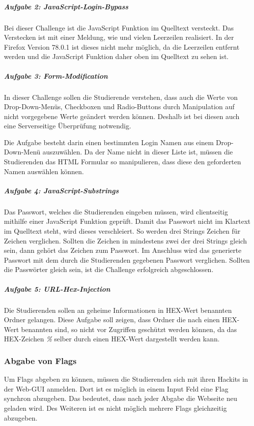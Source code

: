 \subparagraph{Aufgabe 2: JavaScript-Login-Bypass}\label{subpara:Aufgabe_2_JavaScript-Login-Bypass}
Bei dieser Challenge ist die JavaScript Funktion im Quelltext versteckt. Das Verstecken ist mit einer Meldung, wie  und vielen Leerzeilen realisiert. In der Firefox Version 78.0.1 ist dieses nicht mehr möglich, da die Leerzeilen entfernt werden und die JavaScript Funktion daher oben im Quelltext zu sehen ist.

\subparagraph{Aufgabe 3: Form-Modification}\label{subpara:Aufgabe_3_Form-Modification}
In dieser Challenge sollen die Studierende verstehen, dass auch die Werte von Drop-Down-Menüs, Checkboxen und Radio-Buttons durch Manipulation auf nicht vorgegebene Werte geändert werden können. Deshalb ist bei diesen auch eine Serverseitige Überprüfung notwendig.

Die Aufgabe besteht darin einen bestimmten Login Namen aus einem Drop-Down-Menü auszuwählen. Da der Name nicht in dieser Liste ist, müssen die Studierenden das HTML Formular so manipulieren, dass diese den geforderten Namen auswählen können.

\subparagraph{Aufgabe 4: JavaScript-Substrings}\label{subpara:Aufgabe_4_JavaScript-Substrings}
Das Passwort, welches die Studierenden eingeben müssen, wird clientseitig mithilfe einer JavaScript Funktion geprüft. Damit das Passwort nicht im Klartext im Quelltext steht, wird dieses verschleiert. So werden drei Strings Zeichen für Zeichen verglichen. Sollten die Zeichen in mindestens zwei der drei Strings gleich sein, dann gehört das Zeichen zum Passwort. Im Anschluss wird das generierte Passwort mit dem durch die Studierenden gegebenen Passwort verglichen. Sollten die Passwörter gleich sein, ist die Challenge erfolgreich abgeschlossen.

\subparagraph{Aufgabe 5: URL-Hex-Injection}\label{subpara:Aufgabe_5_URL-Hex-Injection}
Die Studierenden sollen an geheime Informationen in HEX-Wert benannten Ordner gelangen. Diese Aufgabe soll zeigen, dass Ordner die nach einen HEX-Wert benannten sind, so nicht vor Zugriffen geschützt werden können, da das HEX-Zeichen \textit{\%} selber durch einen HEX-Wert dargestellt werden kann.

\subsubsection{Abgabe von Flags}\label{subsubsec:Abgabe_von_Flags}
Um Flags abgeben zu können, müssen die Studierenden sich mit ihren Hackits in der Web-GUI anmelden. Dort ist es möglich in einem Input Feld eine Flag synchron abzugeben. Das bedeutet, dass nach jeder Abgabe die Webseite neu geladen wird. Des Weiteren ist es nicht möglich mehrere Flags gleichzeitig abzugeben.

